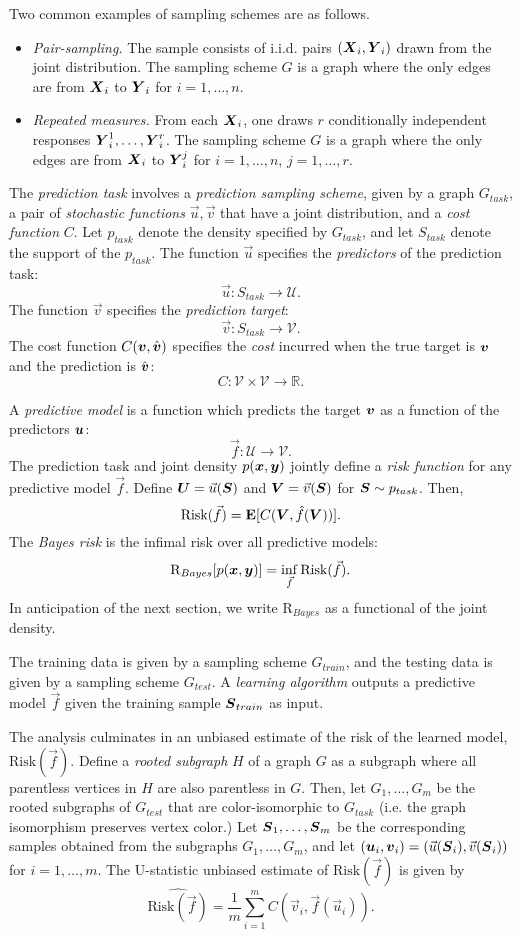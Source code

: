 \documentclass[12pt]{article}
\begin{document}
Two common examples of sampling schemes are as follows.
\begin{itemize}
\item 
\emph{Pair-sampling.}
The sample consists of i.i.d. pairs $(\boldsymbol{X}_i, \boldsymbol{Y}_i)$ drawn from the joint
distribution.  The sampling scheme $G$ is a graph where the
only edges are from $\boldsymbol{X}_i$ to $\boldsymbol{Y}_i$ for $i = 1,\hdots, n$.
\item
\emph{Repeated measures.}
From each $\boldsymbol{X}_i$, one draws $r$ conditionally independent responses
$\boldsymbol{Y}_i^1,\hdots, \boldsymbol{Y}_i^r$.  The sampling scheme $G$ is a graph where
the only edges are from $\boldsymbol{X}_i$ to $\boldsymbol{Y}_i^j$ for $i = 1,\hdots, n$, $j
= 1,\hdots, r$.
\end{itemize}

The \emph{prediction task} involves a \emph{prediction sampling
scheme}, given by a graph $G_{task}$, a pair of \emph{stochastic
functions} $\vec{u}, \vec{v}$ that have a joint distribution, and
a \emph{cost function} $C$.  Let $p_{task}$ denote the density
specified by $G_{task}$, and let $S_{task}$ denote the support of the
$p_{task}$.  The function $\vec{u}$ specifies the \emph{predictors} of
the prediction task: 
\[\vec{u}: S_{task} \to \mathcal{U}.\]
The function $\vec{v}$ specifies the \emph{prediction target}: 
\[\vec{v}: S_{task} \to \mathcal{V}.\]
The cost function $C(\boldsymbol{v}, \hat{\boldsymbol{v}})$ specifies the \emph{cost} incurred when the true target is $\boldsymbol{v}$ and the prediction is $\hat{\boldsymbol{v}}$:
\[C: \mathcal{V} \times \mathcal{V} \to \mathbb{R}.\]

A \emph{predictive model} is a function which predicts the target $\boldsymbol{v}$ as a function of the predictors $\boldsymbol{u}$:
\[
\vec{f}: \mathcal{U} \to \mathcal{V}.
\]
The prediction task and joint density $p(\boldsymbol{x},\boldsymbol{y})$ jointly define
a \emph{risk function} for any predictive model $\vec{f}$. Define $\boldsymbol{U}
= \vec{u}(\boldsymbol{S})$ and $\boldsymbol{V} = \vec{v}(\boldsymbol{S})$ for $\boldsymbol{S} \sim p_{task}$.  Then,
\[
\text{Risk}(\vec{f}) = \textbf{E}[C(\boldsymbol{V}, \hat{f}(\boldsymbol{V}))].
\]
The \emph{Bayes risk} is the infimal risk over all predictive models:
\[
\text{R}_{Bayes}[p(\boldsymbol{x},\boldsymbol{y})] = \inf_{\vec{f}} \text{Risk}(\vec{f}).
\]
In anticipation of the next section, we write $\text{R}_{Bayes}$ as a
functional of the joint density.

The training data is given by a sampling scheme $G_{train}$, and the
testing data is given by a sampling scheme $G_{test}$.
A \emph{learning algorithm} outputs a predictive model $\vec{f}$ given
the training sample $\boldsymbol{S}_{train}$ as input.

The analysis culminates in an unbiased estimate of the risk of the
learned model, $\text{Risk}(\vec{f})$.  Define a \emph{rooted
subgraph} $H$ of a graph $G$ as a subgraph where all parentless
vertices in $H$ are also parentless in $G$.  Then, let $G_1,\hdots,
G_m$ be the rooted subgraphs of $G_{test}$ that are color-isomorphic
to $G_{task}$ (i.e. the graph isomorphism preserves vertex color.)
Let $\boldsymbol{S}_1,\hdots, \boldsymbol{S}_m$ be the corresponding samples obtained from
the subgraphs $G_1,\hdots, G_m$, and let $(\boldsymbol{u}_i, \boldsymbol{v}_i) =
(\vec{u}(\boldsymbol{S}_i), \vec{v}(\boldsymbol{S}_i))$ for $i = 1,\hdots, m$.  The U-statistic unbiased estimate of $\text{Risk}(\vec{f})$ is given by
\[
\widehat{\text{Risk}(\vec{f})} = \frac{1}{m}\sum_{i=1}^m C(\vec{v}_i, \vec{f}(\vec{u}_i)).
\]
\end{document}
